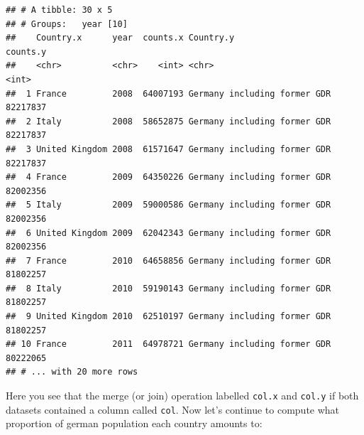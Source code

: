 \documentclass[]{book}
\newenvironment{Shaded}{\begin{snugshade}}{\end{snugshade}}
\newcommand{\KeywordTok}[1]{\textcolor[rgb]{0.13,0.29,0.53}{\textbf{#1}}}
\newcommand{\DataTypeTok}[1]{\textcolor[rgb]{0.13,0.29,0.53}{#1}}
\newcommand{\StringTok}[1]{\textcolor[rgb]{0.31,0.60,0.02}{#1}}
\newcommand{\CommentTok}[1]{\textcolor[rgb]{0.56,0.35,0.01}{\textit{#1}}}
\newcommand{\OperatorTok}[1]{\textcolor[rgb]{0.81,0.36,0.00}{\textbf{#1}}}
\newcommand{\NormalTok}[1]{#1}
\begin{document}
\begin{Shaded}
\end{Shaded}

\begin{verbatim}
## # A tibble: 30 x 5
## # Groups:   year [10]
##    Country.x      year  counts.x Country.y                    counts.y
##    <chr>          <chr>    <int> <chr>                           <int>
##  1 France         2008  64007193 Germany including former GDR 82217837
##  2 Italy          2008  58652875 Germany including former GDR 82217837
##  3 United Kingdom 2008  61571647 Germany including former GDR 82217837
##  4 France         2009  64350226 Germany including former GDR 82002356
##  5 Italy          2009  59000586 Germany including former GDR 82002356
##  6 United Kingdom 2009  62042343 Germany including former GDR 82002356
##  7 France         2010  64658856 Germany including former GDR 81802257
##  8 Italy          2010  59190143 Germany including former GDR 81802257
##  9 United Kingdom 2010  62510197 Germany including former GDR 81802257
## 10 France         2011  64978721 Germany including former GDR 80222065
## # ... with 20 more rows
\end{verbatim}

Here you see that the merge (or join) operation labelled \texttt{col.x}
and \texttt{col.y} if both datasets contained a column called
\texttt{col}. Now let's continue to compute what proportion of german
population each country amounts to:
\end{document}
